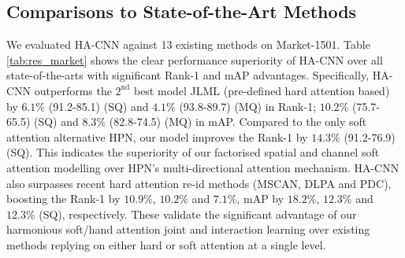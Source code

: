 \documentclass[10pt,twocolumn,letterpaper]{article}
\begin{document}
\subsection{Comparisons to State-of-the-Art Methods}
We evaluated HA-CNN against 13 existing methods on Market-1501.
Table \ref{tab:res_market} shows the clear performance superiority of HA-CNN
over all state-of-the-arts with significant Rank-1 and mAP advantages. 
Specifically, HA-CNN outperforms the $2^\text{nd}$ best model JLML (pre-defined hard attention based)
by $6.1\%$ (91.2-85.1) (SQ) and $4.1\%$ (93.8-89.7) (MQ) in Rank-1; $10.2\%$ (75.7-65.5) (SQ) and $8.3\%$ (82.8-74.5) (MQ) in mAP. 
Compared to the only soft attention alternative HPN,
our model improves the Rank-1 by $14.3\%$ (91.2-76.9) (SQ).
This indicates the superiority of our factorised spatial and channel soft attention modelling
over HPN's multi-directional attention mechanism.
HA-CNN also surpasses recent hard attention re-id methods (MSCAN,  DLPA and PDC),
boosting the Rank-1 by $10.9\%$, $10.2\%$ and $7.1\%$,
mAP by $18.2\%$, $12.3\%$ and $12.3\%$ (SQ), respectively. 
These validate the significant advantage of our harmonious soft/hand attention 
joint and interaction learning
over existing methods replying on either hard or soft attention at a single level. 
\vspace{-0.1cm}
\end{document}
